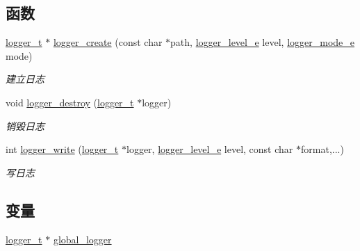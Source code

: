 \subsection*{函数}
\begin{DoxyCompactItemize}
\item 
\hyperlink{a00044_a0468bf19eb27c2a3035789901b262671_a0468bf19eb27c2a3035789901b262671}{logger\+\_\+t} $\ast$ \hyperlink{a00051_a99170db05ea3c90f8799e90d23032562_a99170db05ea3c90f8799e90d23032562}{logger\+\_\+create} (const char $\ast$path, \hyperlink{a00044_afe883c56a5fd8d7794a3dd36780ed9d0_afe883c56a5fd8d7794a3dd36780ed9d0}{logger\+\_\+level\+\_\+e} level, \hyperlink{a00044_aa72cd8c306f50bee7c64e1daa1c1f3f4_aa72cd8c306f50bee7c64e1daa1c1f3f4}{logger\+\_\+mode\+\_\+e} mode)
\begin{DoxyCompactList}\small\item\em 建立日志 \end{DoxyCompactList}\item 
void \hyperlink{a00051_a45bc781df24f677451bcc079de530585_a45bc781df24f677451bcc079de530585}{logger\+\_\+destroy} (\hyperlink{a00044_a0468bf19eb27c2a3035789901b262671_a0468bf19eb27c2a3035789901b262671}{logger\+\_\+t} $\ast$logger)
\begin{DoxyCompactList}\small\item\em 销毁日志 \end{DoxyCompactList}\item 
int \hyperlink{a00051_aad3695a5b5df8331b3c0f3e069f037f5_aad3695a5b5df8331b3c0f3e069f037f5}{logger\+\_\+write} (\hyperlink{a00044_a0468bf19eb27c2a3035789901b262671_a0468bf19eb27c2a3035789901b262671}{logger\+\_\+t} $\ast$logger, \hyperlink{a00044_afe883c56a5fd8d7794a3dd36780ed9d0_afe883c56a5fd8d7794a3dd36780ed9d0}{logger\+\_\+level\+\_\+e} level, const char $\ast$format,...)
\begin{DoxyCompactList}\small\item\em 写日志 \end{DoxyCompactList}\end{DoxyCompactItemize}
\subsection*{变量}
\begin{DoxyCompactItemize}
\item 
\hyperlink{a00044_a0468bf19eb27c2a3035789901b262671_a0468bf19eb27c2a3035789901b262671}{logger\+\_\+t} $\ast$ \hyperlink{a00051_a390c05c7cb68b8334d6418733f330945_a390c05c7cb68b8334d6418733f330945}{global\+\_\+logger}
\end{DoxyCompactItemize}


